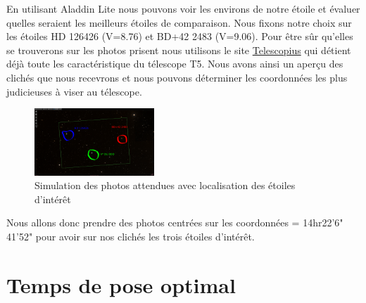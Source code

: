 \documentclass[10pt,french, openany]{book}
\begin{document}
    En utilisant Aladdin Lite nous pouvons voir les environs de notre étoile et évaluer quelles seraient les meilleurs étoiles de comparaison. Nous fixons notre choix sur les étoiles HD 126426 (V=8.76) et BD+42 2483 (V=9.06). Pour être sûr qu'elles se trouverons sur les photos prisent nous utilisons le site \href{https://telescopius.com/telescope-simulator}{Telescopius} qui détient déjà toute les caractéristique du télescope T5. Nous avons ainsi un aperçu des clichés que nous recevrons et nous pouvons déterminer les coordonnées les plus judicieuses à viser au télescope.  
    \begin{figure}[h!]
        \centering
        \includegraphics[width=0.4\textwidth]{telesco.png}
        \caption{Simulation des photos attendues avec localisation des étoiles d'intérêt}
        \label{fig:my_label}
    \end{figure}
    \newpage
    Nous allons donc prendre des photos centrées sur les coordonnées = 14hr22'6" 41'52" pour avoir sur nos clichés les trois étoiles d'intérêt.
\pagebreak
\section{Temps de pose optimal}
\end{document}
